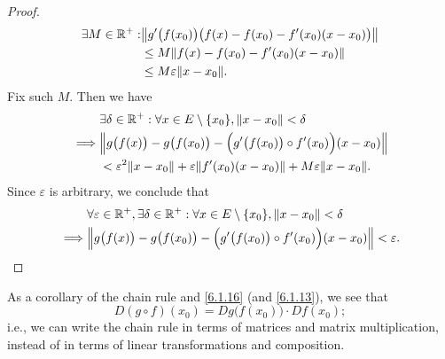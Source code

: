 \begin{proof}
  \begin{align*}
    \exists M \in \R^+ : & \norm*{g'\big(f(x_0)\big) \big(f(x) - f(x_0) - f'(x_0) (x - x_0)\big)} \\
                         & \leq M \norm*{f(x) - f(x_0) - f'(x_0) (x - x_0)}                       \\
                         & \leq M \varepsilon \norm*{x - x_0}.
  \end{align*}
  Fix such \(M\).
  Then we have
  \begin{align*}
             & \exists \delta \in \R^+ : \forall x \in E \setminus \{x_0\}, \norm*{x - x_0} < \delta                   \\
    \implies & \norm*{g\big(f(x)\big) - g\big(f(x_0)\big) - \Big(g'\big(f(x_0)\big) \circ f'(x_0)\Big) (x - x_0)}      \\
             & < \varepsilon^2 \norm*{x - x_0} + \varepsilon \norm*{f'(x_0)(x - x_0)} + M \varepsilon \norm*{x - x_0}.
  \end{align*}
  Since \(\varepsilon\) is arbitrary, we conclude that
  \begin{align*}
             & \forall \varepsilon \in \R^+, \exists \delta \in \R^+ : \forall x \in E \setminus \{x_0\}, \norm*{x - x_0} < \delta \\
    \implies & \norm*{g\big(f(x)\big) - g\big(f(x_0)\big) - \Big(g'\big(f(x_0)\big) \circ f'(x_0)\Big) (x - x_0)} < \varepsilon.
  \end{align*}
\end{proof}

\begin{note}
  As a corollary of the chain rule and \cref{6.1.16} (and \cref{6.1.13}), we see that
  \[
    D (g \circ f)(x_0) = D g\big(f(x_0)\big) \cdot D f(x_0);
  \]
  i.e., we can write the chain rule in terms of matrices and matrix multiplication, instead of in terms of linear transformations and composition.
\end{note}

